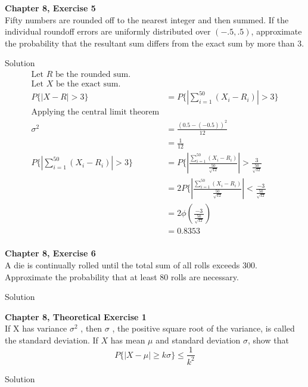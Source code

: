 \documentclass{article}
\begin{document}
\begin{spacing}{1.1}
\newpage
\begin{homeworkProblem}
  {\bf Chapter 8, Exercise 5}\\
  Fifty numbers are rounded off to the nearest integer and then summed. 
  If the individual roundoff errors are uniformly distributed over 
  $(−.5, .5)$, approximate the probability that the resultant sum differs 
  from the exact sum by more than 3.
  \begin{homeworkSection}{Solution}
    \begin{align*}
      \text{Let $R$ be the rounded sum.}\\
      \text{Let $X$ be the exact sum.}\\
      P\{ |X - R| > 3 \} &= P\{ \left|\sum\limits_{i = 1}^{50} (X_i - R_i)\right| > 3\}\\
      \text{Applying the central limit theorem}\\
      \sigma^2 &= \frac{ (0.5 - (- 0.5))^2}{ 12} \\
      &= \frac{ 1}{ 12}\\
      P\{ \left|\sum\limits_{i = 1}^{50} (X_i - R_i)\right| > 3\}
      &= P\{ \left|\frac{ \sum\limits_{i = 1}^{50} (X_i - R_i)}{ \frac{ 50}{ \sqrt{12}}}\right| > \frac{ 3}{ \frac{ 50}{ \sqrt{12}}}\\
      &= 2P\{ \left|\frac{ \sum\limits_{i = 1}^{50} (X_i - R_i)}{ \frac{ 50}{ \sqrt{12}}}\right| < \frac{ -3}{ \frac{ 50}{ \sqrt{12}}}\\
      &= 2 \phi\left( \frac{ -3}{ \frac{ 50}{ \sqrt{12}}}\right)\\
      &= 0.8353\\
    \end{align*}
  \end{homeworkSection}
\end{homeworkProblem}

\newpage
\begin{homeworkProblem}
  {\bf Chapter 8, Exercise 6}\\
  A die is continually rolled until the total sum of all rolls 
  exceeds 300. Approximate the probability that at least 80 rolls 
  are necessary.
  \begin{homeworkSection}{Solution}
    
  \end{homeworkSection}
\end{homeworkProblem}

\newpage
\begin{homeworkProblem}
  {\bf Chapter 8, Theoretical Exercise 1}\\
  If X has variance $\sigma^2$ , then $\sigma$ , the positive square root 
  of the variance, is called the standard deviation. If $X$ has mean $\mu$ 
  and standard deviation $\sigma$, show that
    \[P\{ |X - \mu| \ge k \sigma \} \le \frac{ 1}{ k^2}\]
  \begin{homeworkSection}{Solution}
    

\end{homeworkSection}
\end{homeworkProblem}
\end{spacing}
\end{document}
